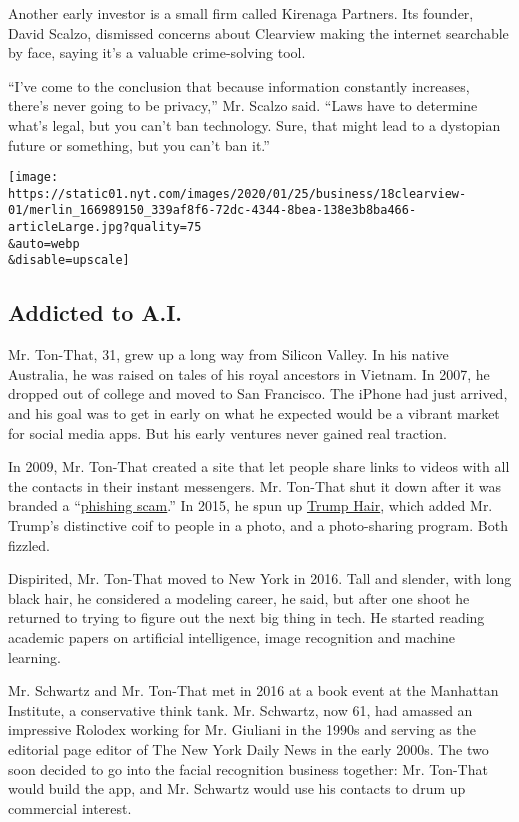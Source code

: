 Another early investor is a small firm called Kirenaga Partners. Its
founder, David Scalzo, dismissed concerns about Clearview making the
internet searchable by face, saying it's a valuable crime-solving tool.

``I've come to the conclusion that because information constantly
increases, there's never going to be privacy,'' Mr. Scalzo said. ``Laws
have to determine what's legal, but you can't ban technology. Sure, that
might lead to a dystopian future or something, but you can't ban it.''

\texttt{[image: https://static01.nyt.com/images/2020/01/25/business/18clearview-01/merlin\_166989150\_339af8f6-72dc-4344-8bea-138e3b8ba466-articleLarge.jpg?quality=75\\\&auto=webp\\\&disable=upscale]}

\hypertarget{addicted-to-ai}{%
\subsection{Addicted to A.I.}\label{addicted-to-ai}}

Mr. Ton-That, 31, grew up a long way from Silicon Valley. In his native
Australia, he was raised on tales of his royal ancestors in Vietnam. In
2007, he dropped out of college and moved to San Francisco. The iPhone
had just arrived, and his goal was to get in early on what he expected
would be a vibrant market for social media apps. But his early ventures
never gained real traction.

In 2009, Mr. Ton-That created a site that let people share links to
videos with all the contacts in their instant messengers. Mr. Ton-That
shut it down after it was branded a
``\href{https://bits.blogs.nytimes.com/2009/02/24/viddyho-phishing-scam-hits-gmail/}{phishing
scam}.'' In 2015, he spun up
\href{https://www.148apps.com/app/1040750174/}{Trump Hair}, which added
Mr. Trump's distinctive coif to people in a photo, and a photo-sharing
program. Both fizzled.

Dispirited, Mr. Ton-That moved to New York in 2016. Tall and slender,
with long black hair, he considered a modeling career, he said, but
after one shoot he returned to trying to figure out the next big thing
in tech. He started reading academic papers on artificial intelligence,
image recognition and machine learning.

Mr. Schwartz and Mr. Ton-That met in 2016 at a book event at the
Manhattan Institute, a conservative think tank. Mr. Schwartz, now 61,
had amassed an impressive Rolodex working for Mr. Giuliani in the 1990s
and serving as the editorial page editor of The New York Daily News in
the early 2000s. The two soon decided to go into the facial recognition
business together: Mr. Ton-That would build the app, and Mr. Schwartz
would use his contacts to drum up commercial interest.

